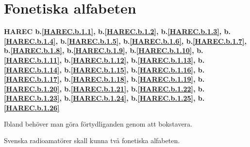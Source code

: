 \section{Fonetiska alfabeten}
\textbf{
HAREC b.\ref{HAREC.b.1.1}\label{myHAREC.b.1.1},
 b.\ref{HAREC.b.1.2}\label{myHAREC.b.1.2},
 b.\ref{HAREC.b.1.3}\label{myHAREC.b.1.3},
 b.\ref{HAREC.b.1.4}\label{myHAREC.b.1.4},
 b.\ref{HAREC.b.1.5}\label{myHAREC.b.1.5},
 b.\ref{HAREC.b.1.6}\label{myHAREC.b.1.6},
 b.\ref{HAREC.b.1.7}\label{myHAREC.b.1.7},
 b.\ref{HAREC.b.1.8}\label{myHAREC.b.1.8},
 b.\ref{HAREC.b.1.9}\label{myHAREC.b.1.9},
 b.\ref{HAREC.b.1.10}\label{myHAREC.b.1.10},
 b.\ref{HAREC.b.1.11}\label{myHAREC.b.1.11},
 b.\ref{HAREC.b.1.12}\label{myHAREC.b.1.12},
 b.\ref{HAREC.b.1.13}\label{myHAREC.b.1.13},
 b.\ref{HAREC.b.1.14}\label{myHAREC.b.1.14},
 b.\ref{HAREC.b.1.15}\label{myHAREC.b.1.15},
 b.\ref{HAREC.b.1.16}\label{myHAREC.b.1.16},
 b.\ref{HAREC.b.1.17}\label{myHAREC.b.1.17},
 b.\ref{HAREC.b.1.18}\label{myHAREC.b.1.18},
 b.\ref{HAREC.b.1.19}\label{myHAREC.b.1.19},
 b.\ref{HAREC.b.1.20}\label{myHAREC.b.1.20},
 b.\ref{HAREC.b.1.21}\label{myHAREC.b.1.21},
 b.\ref{HAREC.b.1.22}\label{myHAREC.b.1.22},
 b.\ref{HAREC.b.1.23}\label{myHAREC.b.1.23},
 b.\ref{HAREC.b.1.24}\label{myHAREC.b.1.24},
 b.\ref{HAREC.b.1.25}\label{myHAREC.b.1.25},
 b.\ref{HAREC.b.1.26}\label{myHAREC.b.1.26}
}

Ibland behöver man göra förtydliganden genom att bokstavera.

Svenska radioamatörer skall kunna två fonetiska alfabeten.


